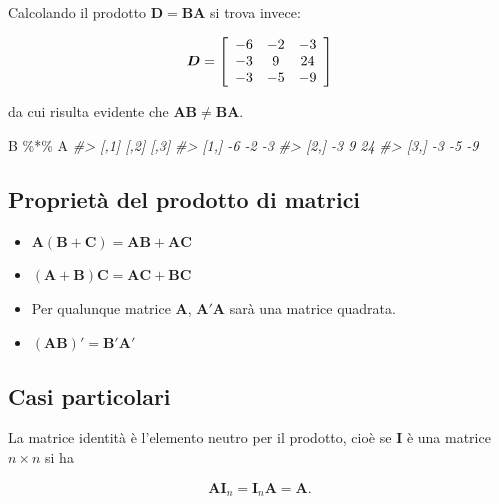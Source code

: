 \documentclass[
  11pt,
]{krantz}
\makeatletter
\newenvironment{Shaded}{\begin{snugshade}}{\end{snugshade}}
\newcommand{\CommentTok}[1]{\textcolor[rgb]{0.37,0.37,0.37}{\textit{#1}}}
\newcommand{\NormalTok}[1]{#1}
\newcommand{\SpecialCharTok}[1]{\textcolor[rgb]{0,0,0}{#1}}
\providecommand{\tightlist}{%
  \setlength{\itemsep}{0pt}\setlength{\parskip}{0pt}}
\newenvironment{kframe}{%
\medskip{}
\setlength{\fboxsep}{.8em}
 \def\at@end@of@kframe{}%
 \ifinner\ifhmode%
  \def\at@end@of@kframe{\end{minipage}}%
  \begin{minipage}{\columnwidth}%
 \fi\fi%
 \def\FrameCommand##1{\hskip\@totalleftmargin \hskip-\fboxsep
 \colorbox{shadecolor}{##1}\hskip-\fboxsep
     \hskip-\linewidth \hskip-\@totalleftmargin \hskip\columnwidth}%
 \MakeFramed {\advance\hsize-\width
   \@totalleftmargin\z@ \linewidth\hsize
   \@setminipage}}%
 {\par\unskip\endMakeFramed%
 \at@end@of@kframe}
\renewenvironment{Shaded}{\begin{kframe}}{\end{kframe}}
\theoremstyle{definition}
\theoremstyle{definition}
\theoremstyle{definition}
\theoremstyle{definition}
\theoremstyle{remark}
\makeatother
\begin{document}
Calcolando il prodotto \(\boldsymbol{D} = \boldsymbol{BA}\) si trova invece:

\[
\boldsymbol{D} =  \left[ \begin{array}{c c c}
-6 & -2 & -3\\
-3 & 9 & 24\\
-3 & -5 & -9
\end{array}
 \right]
 \]

da cui risulta evidente che \(\boldsymbol{AB} \neq \boldsymbol{BA}\).

\begin{Shaded}
\begin{Highlighting}[]
\NormalTok{B }\SpecialCharTok{\%*\%}\NormalTok{ A}
\CommentTok{\#\textgreater{}      [,1] [,2] [,3]}
\CommentTok{\#\textgreater{} [1,]   {-}6   {-}2   {-}3}
\CommentTok{\#\textgreater{} [2,]   {-}3    9   24}
\CommentTok{\#\textgreater{} [3,]   {-}3   {-}5   {-}9}
\end{Highlighting}
\end{Shaded}

\hypertarget{proprietuxe0-del-prodotto-di-matrici}{%
\subsection{Proprietà del prodotto di matrici}\label{proprietuxe0-del-prodotto-di-matrici}}

\begin{itemize}
\tightlist
\item
  \(\boldsymbol{A}(\boldsymbol{B} + \boldsymbol{C}) = \boldsymbol{AB} +  \boldsymbol{AC}\)
\item
  \((\boldsymbol{A} + \boldsymbol{B})\boldsymbol{C} = \boldsymbol{AC} +  \boldsymbol{BC}\)
\item
  Per qualunque matrice \(\boldsymbol{A}\), \(\boldsymbol{A}'\boldsymbol{A}\) sarà una matrice quadrata.
\item
  \((\boldsymbol{AB})' = \boldsymbol{B}'\boldsymbol{A}'\)
\end{itemize}

\hypertarget{casi-particolari}{%
\subsection{Casi particolari}\label{casi-particolari}}

La matrice identità è l'elemento neutro per il prodotto, cioè se \(\boldsymbol{I}\) è una matrice \(n \times n\) si ha

\[
\boldsymbol{A} \boldsymbol{I}_n = \boldsymbol{I}_n \boldsymbol{A}
= \boldsymbol{A}.
\]
\end{document}
